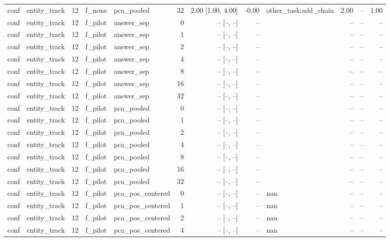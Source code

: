 \begin{tabular}{llrllrrrlrrr}
conf & entity\_track & 12 & f\_none & pca\_pooled & 32 & 2.00 [1.00, 4.00] & -0.00 & other\_task:add\_chain & 2.00 & -- & 1.00 \\
conf & entity\_track & 12 & f\_pilot & answer\_sep & 0 & -- [--, --] & -- &  & -- & -- & -- \\
conf & entity\_track & 12 & f\_pilot & answer\_sep & 1 & -- [--, --] & -- &  & -- & -- & -- \\
conf & entity\_track & 12 & f\_pilot & answer\_sep & 2 & -- [--, --] & -- &  & -- & -- & -- \\
conf & entity\_track & 12 & f\_pilot & answer\_sep & 4 & -- [--, --] & -- &  & -- & -- & -- \\
conf & entity\_track & 12 & f\_pilot & answer\_sep & 8 & -- [--, --] & -- &  & -- & -- & -- \\
conf & entity\_track & 12 & f\_pilot & answer\_sep & 16 & -- [--, --] & -- &  & -- & -- & -- \\
conf & entity\_track & 12 & f\_pilot & answer\_sep & 32 & -- [--, --] & -- &  & -- & -- & -- \\
conf & entity\_track & 12 & f\_pilot & pca\_pooled & 0 & -- [--, --] & -- &  & -- & -- & -- \\
conf & entity\_track & 12 & f\_pilot & pca\_pooled & 1 & -- [--, --] & -- &  & -- & -- & -- \\
conf & entity\_track & 12 & f\_pilot & pca\_pooled & 2 & -- [--, --] & -- &  & -- & -- & -- \\
conf & entity\_track & 12 & f\_pilot & pca\_pooled & 4 & -- [--, --] & -- &  & -- & -- & -- \\
conf & entity\_track & 12 & f\_pilot & pca\_pooled & 8 & -- [--, --] & -- &  & -- & -- & -- \\
conf & entity\_track & 12 & f\_pilot & pca\_pooled & 16 & -- [--, --] & -- &  & -- & -- & -- \\
conf & entity\_track & 12 & f\_pilot & pca\_pooled & 32 & -- [--, --] & -- &  & -- & -- & -- \\
conf & entity\_track & 12 & f\_pilot & pca\_pos\_centered & 0 & -- [--, --] & -- & nan & -- & -- & -- \\
conf & entity\_track & 12 & f\_pilot & pca\_pos\_centered & 1 & -- [--, --] & -- & nan & -- & -- & -- \\
conf & entity\_track & 12 & f\_pilot & pca\_pos\_centered & 2 & -- [--, --] & -- & nan & -- & -- & -- \\
conf & entity\_track & 12 & f\_pilot & pca\_pos\_centered & 4 & -- [--, --] & -- & nan & -- & -- & -- \\

\end{tabular}
